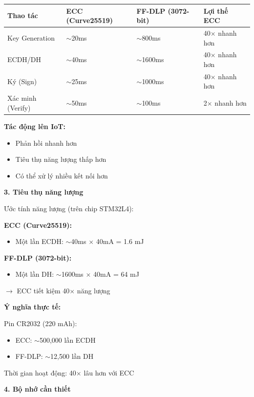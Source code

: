 \begin{center}
\begin{tabular}{|p{3.5cm}|p{3cm}|p{3cm}|p{3cm}|}
\hline
\textbf{Thao tác} & \textbf{ECC (Curve25519)} & \textbf{FF-DLP (3072-bit)} & \textbf{Lợi thế ECC} \\
\hline
Key Generation & $\sim$20ms & $\sim$800ms & 40$\times$ nhanh hơn \\
ECDH/DH & $\sim$40ms & $\sim$1600ms & 40$\times$ nhanh hơn \\
Ký (Sign) & $\sim$25ms & $\sim$1000ms & 40$\times$ nhanh hơn \\
Xác minh (Verify) & $\sim$50ms & $\sim$100ms & 2$\times$ nhanh hơn \\
\hline
\end{tabular}
\end{center}

\textbf{Tác động lên IoT:}
\begin{itemize}
    \item Phản hồi nhanh hơn
    \item Tiêu thụ năng lượng thấp hơn
    \item Có thể xử lý nhiều kết nối hơn
\end{itemize}

\textbf{3. Tiêu thụ năng lượng}

Ước tính năng lượng (trên chip STM32L4):

\textbf{ECC (Curve25519):}
\begin{itemize}
    \item Một lần ECDH: $\sim$40ms $\times$ 40mA = 1.6 mJ
\end{itemize}

\textbf{FF-DLP (3072-bit):}
\begin{itemize}
    \item Một lần DH: $\sim$1600ms $\times$ 40mA = 64 mJ
\end{itemize}

$\rightarrow$ ECC tiết kiệm 40$\times$ năng lượng

\textbf{Ý nghĩa thực tế:}

Pin CR2032 (220 mAh):
\begin{itemize}
    \item ECC: $\sim$500,000 lần ECDH
    \item FF-DLP: $\sim$12,500 lần DH
\end{itemize}

Thời gian hoạt động: 40$\times$ lâu hơn với ECC

\textbf{4. Bộ nhớ cần thiết}

